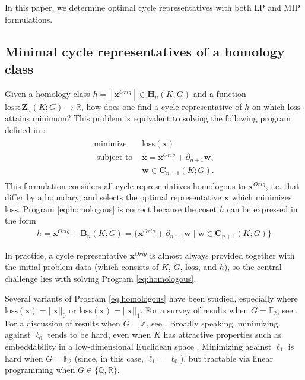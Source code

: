 \documentclass[11pt,onecolumn]{article}
\newcommand{\R}{\mathbb{R}}
\newcommand{\Z}{\mathbb{Z}}
\newcommand{\Q}{\mathbb{Q}}
\newcommand{\field}{\mathbb{F}}
\newcommand{\Chains}{\mathbf{C}}
\newcommand{\Homologies}[0]{\mathbf{H}}
\newcommand{\Boundaries}[0]{\mathbf{B}}
\newcommand{\Cycles}[0]{\mathbf{Z}}
\newcommand{\originalrep}{\mathbf{x}^{Orig}}
\newcommand{\optimalrep}{\mathbf{x}}
\newcommand{\boundingchain}{\mathbf{w}}
\newcommand{\hclass}{h} %
\newcommand{\loss}{\mathrm{loss}}
\newcommand{\pr}{Program }
\theoremstyle{plain}
\theoremstyle{definition}
\begin{document}
In this paper, we determine optimal cycle representatives with both LP and MIP formulations.

\subsection{Minimal cycle representatives of a homology class} \label{singlecyclecase}


Given a homology class $\hclass =[\originalrep] \in \Homologies_n(K; G)$ and a function $\loss: \Cycles_n(K;G) \to \R$, how does one find a cycle representative of $\hclass$ on which $\loss$ attains minimum?  This problem is equivalent to  solving the following program defined in \cite{dey2011optimal}:
\begin{align}
   \begin{split}
    \text{minimize } & \loss(\optimalrep) \\
    \text{ subject to } & \optimalrep = \originalrep + \partial_{n+1} \boundingchain, \\
    & \boundingchain \in \Chains_{n+1}(K; G).
   \end{split}
   \label{eq:homologous}
\end{align}
This formulation considers all cycle representatives homologous to $\originalrep$, i.e. that differ by a boundary, and selects the optimal representative $\optimalrep$ which minimizes $\loss$.
\pr \eqref{eq:homologous} is correct because the coset $\hclass$ can be expressed in the form
    \begin{align*}
    \hclass
    =
    \originalrep + \Boundaries_n(K; G) 
    =
    \{ \originalrep + \partial_{n+1} \boundingchain \mid \boundingchain \in \Chains_{n+1}(K; G) \}
    \end{align*}  
 
In practice, a cycle representative $\originalrep$ is almost always provided together with the initial problem data (which consists of $K$, $G$, $\loss$, and $\hclass$), so the central challenge lies with solving \pr \eqref{eq:homologous}.



Several variants of \pr \eqref{eq:homologous} have been studied, especially where $\loss(\optimalrep) = ||\optimalrep||_0$ or $\loss(\optimalrep) = ||\optimalrep||_1$.  For a survey of results when $G = \field_2$, see \cite{chenhardness}.  For a discussion of results when $G = \Z$, see \cite{dey2011optimal}.  Broadly  speaking, minimizing against $\ell_0$  tends to be hard, even when $K$ has attractive properties such as embeddability in a low-dimensional Euclidean space \cite{borradaile2020minimum}.  Minimizing against $\ell_1$  is hard when $G = \field_2$ (since, in this case, $\ell_1 = \ell_0$),  but tractable via linear programming when $G \in \{\Q, \R\}$.  
\end{document}
